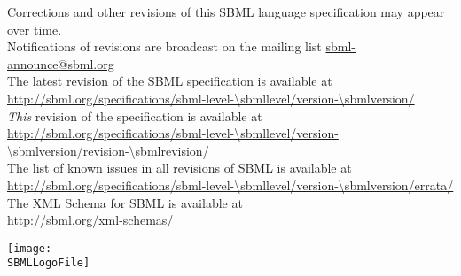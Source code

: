 \begin{center}
Corrections and other revisions of this SBML language specification may appear over time.\\
Notifications of revisions are broadcast on the mailing list \url{sbml-announce@sbml.org}\\[10pt]

The latest revision of the SBML \thisLV specification is available at\\
\url{http://sbml.org/specifications/sbml-level-\sbmllevel/version-\sbmlversion/}\\[10pt]

\emph{This} revision of the specification is available at\\
\url{http://sbml.org/specifications/sbml-level-\sbmllevel/version-\sbmlversion/revision-\sbmlrevision/}\\[10pt]

The list of known issues in all revisions of SBML \thisLV is available at\\
\url{http://sbml.org/specifications/sbml-level-\sbmllevel/version-\sbmlversion/errata/}\\[10pt]

The XML Schema for SBML \thisLV is available at\\
\url{http://sbml.org/xml-schemas/}\\[10pt]
\end{center}

\vfill


\ifgrayscalespec
  \newcommand{\logofilebasename}{sbml-logo-gray}
\else
  \newcommand{\logofilebasename}{sbml-logo}
\fi


\ifx\pdfoutput\undefined%
  \newcommand{\SBMLLogoFile}{\logofilebasename}
\else
  \newcommand{\SBMLLogoFile}{\logofilebasename.jpg}
\fi

\centerline{\texttt{[image: \\SBMLLogoFile]}}
